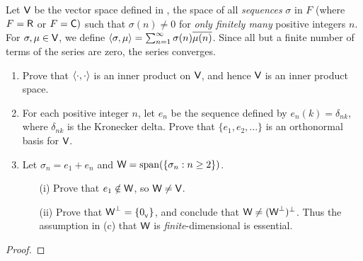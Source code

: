 \begin{exercise} \label{exercise 6.2.23}
Let \(\textsf{V}\) be the vector space defined in , the space of all \emph{sequences} \(\sigma\) in \(F\) (where \(F = \textsf{R}\) or \(F = \textsf{C})\) such that \(\sigma(n) \ne 0\) for \emph{only finitely many} positive integers \(n\).
For \(\sigma, \mu \in \textsf{V}\), we define \(\left< \sigma, \mu \right> = \sum_{n = 1}^{\infty} \sigma(n) \overline{\mu(n)}\).
Since all but a finite number of terms of the series are zero, the series converges.
\begin{enumerate}
\item Prove that \(\left< \cdot, \cdot \right>\) is an inner product on \(\textsf{V}\), and hence \(\textsf{V}\) is an inner product space.
\item For each positive integer \(n\), let \(e_n\) be the sequence defined by \(e_n(k) = \delta_{nk}\), where \(\delta_{nk}\) is the Kronecker delta.
Prove that \(\{ e_1, e_2, ... \}\) is an orthonormal basis for \(\textsf{V}\).
\item Let \(\sigma_n = e_1 + e_n\) and \(\textsf{W} = \operatorname{span}(\{ \sigma_n : n \ge 2 \})\).
    \begin{enumerate}
    \item[(i)] Prove that \(e_1 \notin \textsf{W}\), so \(\textsf{W} \ne \textsf{V}\).
    \item[(ii)] Prove that \(\textsf{W}^{\perp} = \{ 0_{_{\textsf{V}}} \}\), and conclude that \(\textsf{W} \ne (\textsf{W}^{\perp})^{\perp}\).
    Thus the assumption in (c) that \(\textsf{W}\) is \emph{finite}-dimensional is essential.
    \end{enumerate}
\end{enumerate}
\end{exercise}

\begin{proof}
\end{proof}
